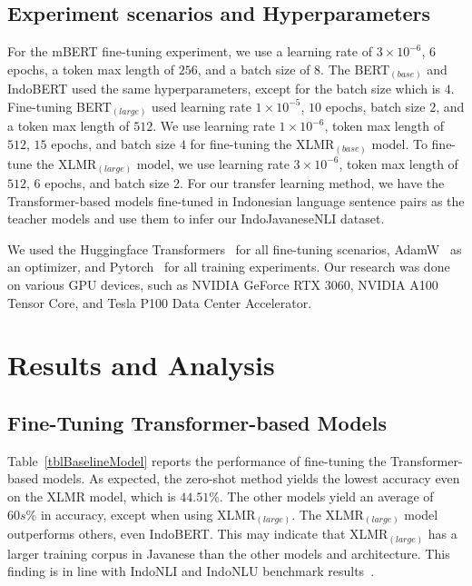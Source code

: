 \documentclass[a4paper, conference]{IEEEtran}
\begin{document}
\subsection{Experiment scenarios and Hyperparameters}
For the mBERT fine-tuning experiment, we use a learning rate of $3 \times 10^{-6}$, $6$ epochs, a token max length of $256$, and a batch size of $8$. The BERT$_{(base)}$ and IndoBERT used the same hyperparameters, except for the batch size which is $4$. Fine-tuning BERT$_{(large)}$ used learning rate $1 \times 10^{-5}$, $10$ epochs, batch size $2$, and a token max length of $512$. We use learning rate $1 \times 10^{-6}$, token max length of $512$, $15$ epochs, and batch size $4$ for fine-tuning the XLMR$_{(base)}$ model. To fine-tune the XLMR$_{(large)}$ model, we use learning rate $3 \times 10^{-6}$, token max length of $512$, $6$ epochs, and batch size 2. For our transfer learning method, we have the Transformer-based models fine-tuned in Indonesian language sentence pairs as the teacher models and use them to infer our IndoJavaneseNLI dataset.

We used the Huggingface Transformers~\cite{Wolf2019} for all fine-tuning scenarios, AdamW~\cite{Loshchilov2019} as an optimizer, and Pytorch~\cite{Paszke2017} for all training experiments. Our research was done on various GPU devices, such as NVIDIA GeForce RTX 3060, NVIDIA A100 Tensor Core, and Tesla P100 Data Center Accelerator.

\section{Results and Analysis}
\subsection{Fine-Tuning Transformer-based Models}
Table~\ref{tblBaselineModel} reports the performance of fine-tuning the Transformer-based models. As expected, the zero-shot method yields the lowest accuracy even on the XLMR model, which is $44.51\%$. The other models yield an average of $60s\%$ in accuracy, except when using XLMR$_{(large)}$. The XLMR$_{(large)}$ model outperforms others, even IndoBERT. This may indicate that XLMR$_{(large)}$ has a larger training corpus in Javanese than the other models and architecture. This finding is in line with IndoNLI and IndoNLU benchmark results~\cite{Mahendra2021, Wilie2020}.
\end{document}
